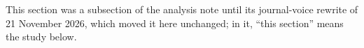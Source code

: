 This section was a subsection of the analysis note until its journal-voice rewrite of 21 November 2026, which moved it here unchanged; in it, ``this section'' means the study below.

